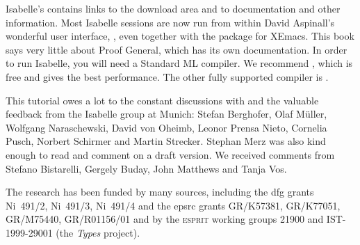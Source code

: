 Isabelle's  contains links to
the download area and to documentation and other information.  Most Isabelle
sessions are now run from within David Aspinall's
wonderful user interface, , even together with the
 package for XEmacs.  This
book says very little about Proof General, which has its own documentation.
In order to run Isabelle, you will need a Standard ML compiler.  We recommend
, which is free and gives the best
performance.  The other fully supported compiler is
.

This tutorial owes a lot to the constant discussions with and the valuable
feedback from the Isabelle group at Munich: Stefan Berghofer, Olaf
M{\"u}ller, Wolfgang Naraschewski, David von Oheimb, Leonor Prensa Nieto,
Cornelia Pusch, Norbert Schirmer and Martin Strecker. Stephan
Merz was also kind enough to read and comment on a draft version.  We
received comments from Stefano Bistarelli, Gergely Buday, John Matthews
and Tanja Vos.

The research has been funded by many sources, including the {\sc dfg} grants
Ni~491/2, Ni~491/3, Ni~491/4 and the {\sc epsrc} grants GR\slash K57381,
GR\slash K77051, GR\slash M75440, GR\slash R01156\slash 01 and by the
\textsc{esprit} working groups 21900 and IST-1999-29001 (the \emph{Types}
project).

